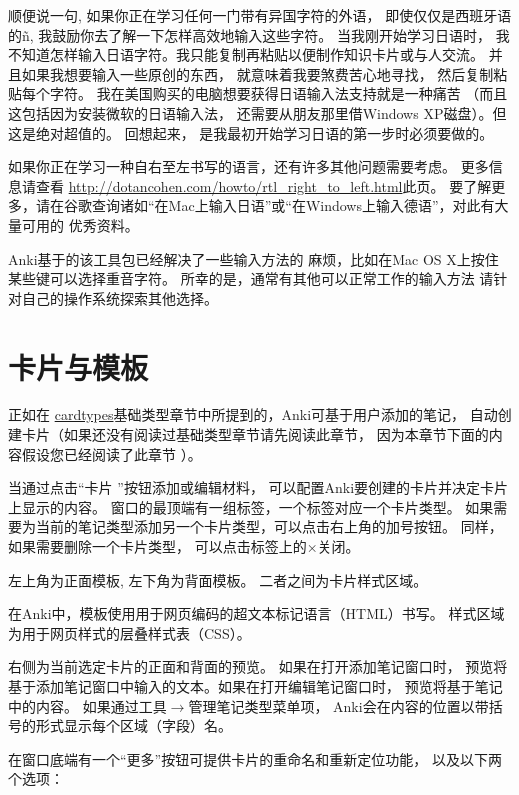 \documentclass[a4paper]{book}
\begin{document}
	\begin{fquote}
		顺便说一句, 如果你正在学习任何一门带有异国字符的外语， 即使仅仅是西班牙语的ñ, 我鼓励你去了解一下怎样高效地输入这些字符。 当我刚开始学习日语时， 我不知道怎样输入日语字符。我只能复制再粘贴以便制作知识卡片或与人交流。 并且如果我想要输入一些原创的东西， 就意味着我要煞费苦心地寻找， 然后复制粘贴每个字符。 我在美国购买的电脑想要获得日语输入法支持就是一种痛苦 （而且这包括因为安装微软的日语输入法， 还需要从朋友那里借Windows XP磁盘）。但这是绝对超值的。
		回想起来， 是我最初开始学习日语的第一步时必须要做的。
	\end{fquote}
	
	如果你正在学习一种自右至左书写的语言，还有许多其他问题需要考虑。 更多信息请查看
	\url{http://dotancohen.com/howto/rtl_right_to_left.html}此页。
	要了解更多，请在谷歌查询诸如“在Mac上输入日语”或“在Windows上输入德语”，对此有大量可用的 优秀资料。
	
	\begin{shaded}
		Anki基于的该工具包已经解决了一些输入方法的 麻烦，比如在Mac OS X上按住某些键可以选择重音字符。 所幸的是，通常有其他可以正常工作的输入方法 请针对自己的操作系统探索其他选择。
	\end{shaded}
	
	\chapter{卡片与模板}
	
	正如在 \url{cardtypes}基础类型章节中所提到的，Anki可基于用户添加的笔记， 自动创建卡片（如果还没有阅读过基础类型章节请先阅读此章节， 因为本章节下面的内容假设您已经阅读了此章节 ）。
	
	当通过点击“卡片
	”按钮添加或编辑材料， 可以配置Anki要创建的卡片并决定卡片上显示的内容。 窗口的最顶端有一组标签，一个标签对应一个卡片类型。 如果需要为当前的笔记类型添加另一个卡片类型，可以点击右上角的加号按钮。 同样，如果需要删除一个卡片类型， 可以点击标签上的×关闭。
	
	左上角为正面模板, 左下角为背面模板。 二者之间为卡片样式区域。
	
	在Anki中，模板使用用于网页编码的超文本标记语言（HTML）书写。 样式区域为用于网页样式的层叠样式表（CSS）。
	
	右侧为当前选定卡片的正面和背面的预览。 如果在打开添加笔记窗口时， 预览将基于添加笔记窗口中输入的文本。如果在打开编辑笔记窗口时， 预览将基于笔记中的内容。 如果通过工具$\to$管理笔记类型菜单项， Anki会在内容的位置以带括号的形式显示每个区域（字段）名。
	
	在窗口底端有一个“更多”按钮可提供卡片的重命名和重新定位功能， 以及以下两个选项：
	
\end{document}
